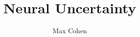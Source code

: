 \documentclass[11pt,a4paper]{report}
\begin{document}
\title{Neural Uncertainty}
\author{Max Cohen}
\maketitle
\end{document}
